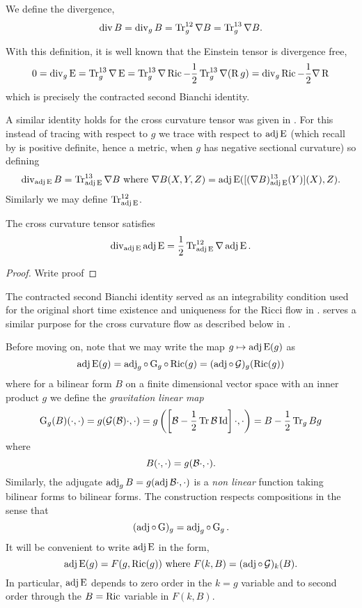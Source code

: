 \documentclass[a4paper, 12pt]{amsart}
\begin{document}
We define the divergence,
\[
\operatorname{div} B = \operatorname{div}_g B = \operatorname{Tr}_g^{12} \nabla B = \operatorname{Tr}_g^{13} \nabla B.
\]

With this definition, it is well known that the Einstein tensor is divergence free,
\begin{equation}
\label{eq:ein_divfree}
0 = \operatorname{div}_g \operatorname{E} = \operatorname{Tr}_g^{13} \nabla \operatorname{E} = \operatorname{Tr}_g^{13} \nabla \operatorname{Ric} - \frac{1}{2} \operatorname{Tr}_g^{13} \nabla (\operatorname{R} g) = \operatorname{div}_g \operatorname{Ric} - \frac{1}{2} \nabla \operatorname{R}
\end{equation}
which is precisely the contracted second Bianchi identity.

A similar identity holds for the cross curvature tensor was given in \cite[Lemma 1]{MR2055396}. For this instead of tracing with respect to \(g\) we trace with respect to \(\operatorname{adj}\operatorname{E}\) (which recall by  is positive definite, hence a metric, when \(g\) has negative sectional curvature) so defining
\[
\operatorname{div}_{\operatorname{adj}\operatorname{E}} B = \operatorname{Tr}_{\operatorname{adj}\operatorname{E}}^{13} \nabla B \text{ where } \nabla B(X, Y, Z) = \operatorname{adj}\operatorname{E}([(\nabla B)_{\operatorname{adj}\operatorname{E}}^{13}(Y)] (X), Z).
\]
Similarly we may define \(\operatorname{Tr}_{\operatorname{adj}\operatorname{E}}^{12}\).
\begin{lemma}
\label{lem:xcf_hamilton_integrability}
The cross curvature tensor satisfies
\[
\operatorname{div}_{\operatorname{adj}\operatorname{E}} \operatorname{adj}\operatorname{E} = \frac{1}{2} \operatorname{Tr}^{12}_{\operatorname{adj}\operatorname{E}} \nabla \operatorname{adj}\operatorname{E}.
\]
\end{lemma}
\begin{proof}
{\color{red}Write proof}
\end{proof}
The contracted second Bianchi identity served as an integrability condition used for the original short time existence and uniqueness for the Ricci flow in \cite{Hamilton:/1982}.  serves a similar purpose for the cross curvature flow as described below in .

Before moving on, note that we may write the map \(g \mapsto \operatorname{adj}\operatorname{E}(g)\) as
\[
\operatorname{adj}\operatorname{E}(g) = \operatorname{adj}_g \circ \operatorname{G}_g \circ \operatorname{Ric} (g) = (\operatorname{adj} \circ \operatorname{\mathcal{G}})_g (\operatorname{Ric}(g))
\]
where for a bilinear form \(B\) on a finite dimensional vector space with an inner product \(g\) we define the \emph{gravitation linear map}
\[
\operatorname{G}_g(B) (\cdot, \cdot) = g(\operatorname{\mathcal{G}}(\mathcal{B}) \cdot, \cdot) = g\left(\left[\mathcal{B} - \frac{1}{2} \operatorname{Tr}\mathcal{B} \operatorname{Id}\right] \cdot, \cdot\right) = B - \frac{1}{2} \operatorname{Tr}_g B g
\]
where
\[
B(\cdot, \cdot) = g(\mathcal{B} \cdot, \cdot).
\]
Similarly, the adjugate \(\operatorname{adj}_g B = g(\operatorname{adj}\mathcal{B} \cdot, \cdot)\) is a \emph{non linear} function taking bilinear forms to bilinear forms. The construction respects compositions in the sense that
\[
(\operatorname{adj} \circ \operatorname{G})_g = \operatorname{adj}_g \circ \operatorname{G}_g.
\]
It will be convenient to write \(\operatorname{adj}\operatorname{E}\) in the form,
\begin{equation}
\label{eq:adjein_op}
\operatorname{adj}\operatorname{E} (g) = F(g, \operatorname{Ric}(g)) \text{ where } F(k, B) = (\operatorname{adj} \circ \operatorname{\mathcal{G}})_k (B).
\end{equation}
In particular, \(\operatorname{adj}\operatorname{E}\) depends to zero order in the \(k=g\) variable and to second order through the \(B = \operatorname{Ric}\) variable in \(F(k, B)\).
\end{document}
